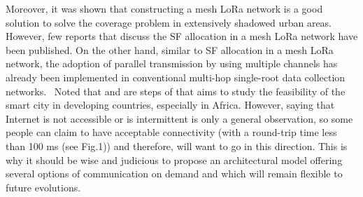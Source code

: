  \cite{ke_lora_2017}   Moreover, it was shown \cite{ke_lora_2017} that constructing a mesh LoRa network is a good solution to solve the coverage problem in extensively shadowed urban areas. However, few reports that discuss the SF allocation in a mesh LoRa network have been published. On the other hand, similar to SF allocation in a mesh LoRa network, the adoption of parallel transmission by using multiple channels has already been implemented in conventional multi-hop single-root data collection networks.~   \newline 
 \cite{afonso_design_2019}    \newline 
 \cite{angrisani_lora_2017}    \newline 
 \cite{aref_free_2014}    \newline 
 \cite{delobel_analysis_2017}    \newline 
 \cite{dongare_openchirp_2017}    \newline 
 \cite{erturk_survey_2019}    \newline 
 \cite{haxhibeqiri_survey_2018}    \newline 
 \cite{li_application_2017}    \newline 
 \cite{magno_wulora_2017}    \newline 
 \cite{mahmood_scalability_2019}    \newline 
 \cite{martinez_performance_2019}    \newline 
 \cite{navarro-ortiz_integration_2018}    \newline 
 \cite{nolan_evaluation_2016}    \newline 
 \cite{noreen_study_2017}    \newline 
 \cite{oliveira_long_2017}    \newline 
 \cite{ozyilmaz_designing_2019}    \newline 
 \cite{radcliffe_usability_2017}    \newline 
 \cite{rizzi_evaluation_2017}    \newline 
 \cite{san-um_long-range_2017}    \newline 
 \cite{sartori_enabling_2017}    \newline 
 \cite{stan_overview_2016}    \newline 
 \cite{venkatesan_design_2017}    \newline 
 \cite{wang_performance_2017}    \newline 
 \cite{barro_smart_2019}   Noted that \cite{barro_tltn_2019} and \cite{barro_smart_2019} are steps of \cite{barro_towards_2018} that aims to study the feasibility of the smart city in developing countries, especially in Africa. However, saying that Internet is not accessible or is intermittent is only a general observation, so some people can claim to have acceptable connectivity \cite{barro_smart_2019} (with a round-trip time less than 100 ms (see Fig.1)) and therefore, will want to go in this direction. This is why it should be wise and judicious to propose an architectural model offering several options of communication on demand and which will remain flexible to future evolutions.   \newline 
